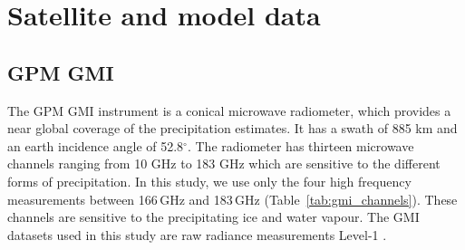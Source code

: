 \documentclass[amt, manuscript]{copernicus}
\begin{document}




 


\section{Satellite and model data}
\label{sec:data}
\subsection{GPM GMI}

The GPM GMI instrument is a conical microwave radiometer, which provides a near global coverage of the precipitation estimates. It has a swath of 885\,\,km  and an earth incidence angle of 52.8$^{\circ}$. The radiometer has thirteen microwave channels ranging from 10\,\,GHz to 183\,\,GHz which are sensitive to the different forms of precipitation. In this study, we use only the four high frequency measurements between 166\,GHz and 183\,GHz (Table~\ref{tab:gmi_channels}). These channels are sensitive to the precipitating ice and water vapour. The GMI datasets used in this study are raw radiance measurements Level-1 \citep[L1B,][]{gpm:16}. 
\end{document}
